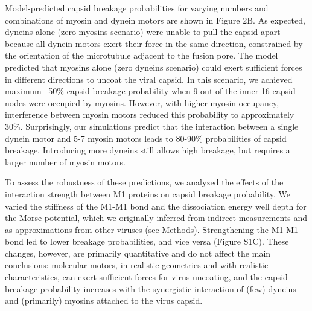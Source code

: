 Model-predicted capsid breakage probabilities for varying numbers and combinations of myosin and dynein motors are shown in Figure 2B. As expected, dyneins alone (zero myosins scenario) were unable to pull the capsid apart because all dynein motors exert their force in the same direction, constrained by the orientation of the microtubule adjacent to the fusion pore. The model predicted that myosins alone (zero dyneins scenario) could exert sufficient forces in different directions to uncoat the viral capsid. In this scenario, we achieved maximum ~50\% capsid breakage probability when 9 out of the inner 16 capsid nodes were occupied by myosins. However, with higher myosin occupancy, interference between myosin motors reduced this probability to approximately 30\%. Surprisingly, our simulations predict that the interaction between a single dynein motor and 5-7 myosin motors leads to 80-90\% probabilities of capsid breakage. Introducing more dyneins still allows high breakage, but requires a larger number of myosin motors.

To assess the robustness of these predictions, we analyzed the effects of the interaction strength between M1 proteins on capsid breakage probability. We varied the stiffness of the M1-M1 bond and the dissociation energy well depth for the Morse potential, which we originally inferred from indirect measurements and as approximations from other viruses (see Methods). Strengthening the M1-M1 bond led to lower breakage probabilities, and vice versa (Figure S1C). These changes, however, are primarily quantitative and do not affect the main conclusions: molecular motors, in realistic geometries and with realistic characteristics, can exert sufficient forces for virus uncoating, and the capsid breakage probability increases with the synergistic interaction of (few) dyneins and (primarily) myosins attached to the virus capsid.
